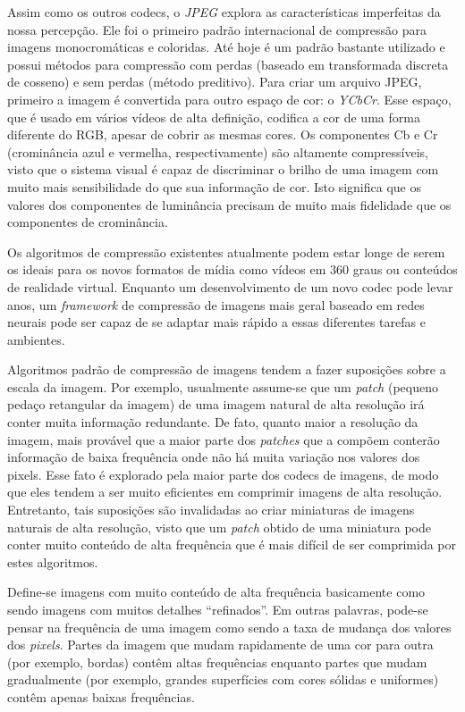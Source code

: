 Assim como os outros codecs, o \textit{JPEG} explora as características imperfeitas da nossa percepção. Ele foi o primeiro padrão internacional de compressão para imagens monocromáticas e coloridas. Até hoje é um padrão bastante utilizado e possui métodos para compressão com perdas (baseado em transformada discreta de cosseno) e sem perdas (método preditivo). Para criar um arquivo JPEG, primeiro a imagem é convertida para outro espaço de cor: o \textit{YCbCr}. Esse espaço, que é usado em vários vídeos de alta definição, codifica a cor de uma forma diferente do RGB, apesar de cobrir as mesmas cores. Os componentes Cb e Cr (crominância azul e vermelha, respectivamente) são altamente compressíveis, visto que o sistema visual é capaz de discriminar o brilho de uma imagem com muito mais sensibilidade do que sua informação de cor. Isto significa que os valores dos componentes de luminância precisam de muito mais fidelidade que os componentes de crominância.

Os algoritmos de compressão existentes atualmente podem estar longe de serem os ideais para os novos formatos de mídia como vídeos em 360 graus ou conteúdos de realidade virtual. Enquanto um desenvolvimento de um novo codec pode levar anos, um \textit{framework} de compressão de imagens mais geral baseado em redes neurais pode ser capaz de se adaptar mais rápido a essas diferentes tarefas e ambientes.

Algoritmos padrão de compressão de imagens tendem a fazer suposições sobre a escala da imagem. Por exemplo, usualmente assume-se que um \textit{patch} (pequeno pedaço retangular da imagem) de uma imagem natural de alta resolução irá conter muita informação redundante. De fato, quanto maior a resolução da imagem, mais provável que a maior parte dos \textit{patches} que a compõem conterão informação de baixa frequência onde não há muita variação nos valores dos pixels. Esse fato é explorado pela maior parte dos codecs de imagens, de modo que eles tendem a ser muito eficientes em comprimir imagens de alta resolução. Entretanto, tais suposições são invalidadas ao criar miniaturas de imagens naturais de alta resolução, visto que um \textit{patch} obtido de uma miniatura pode conter muito conteúdo de alta frequência que é mais difícil de ser comprimida por estes algoritmos. 

Define-se imagens com muito conteúdo de alta frequência basicamente como sendo imagens com muitos detalhes ``refinados''. Em outras palavras, pode-se pensar na frequência de uma imagem como sendo a taxa de mudança dos valores dos \textit{pixels}. Partes da imagem que mudam rapidamente de uma cor para outra (por exemplo, bordas) contêm altas frequências enquanto partes que mudam gradualmente (por exemplo, grandes superfícies com cores sólidas e uniformes) contêm apenas baixas frequências.
